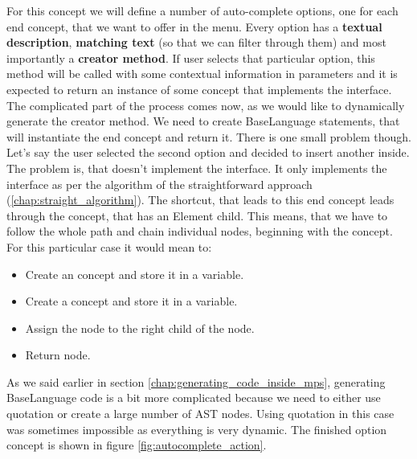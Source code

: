 For this concept we will define a number of auto-complete options, one for each end concept, that we want to offer in the menu.
Every option has a \textbf{textual description}, \textbf{matching text} (so that we can filter through them) and most importantly a \textbf{creator method}.
If user selects that particular option, this method will be called with some contextual information in parameters and it is expected to return an instance of some concept that implements the  interface.
\\

The complicated part of the process comes now, as we would like to dynamically generate the creator method.
We need to create BaseLanguage statements, that will instantiate the end concept and return it.
There is one small problem though.
Let's say the user selected the second option and decided to insert another  inside.
The problem is, that  doesn't implement the  interface.
It only implements the  interface as per the algorithm of the straightforward approach (\ref{chap:straight_algorithm}).
The shortcut, that leads to this end concept leads through the  concept, that has an Element child.
This means, that we have to follow the whole path and chain individual nodes, beginning with the  concept.
For this particular case it would mean to:

\begin{itemize}
	\item Create an  concept and store it in a variable.

	\item Create a  concept and store it in a variable.

	\item Assign the  node to the right child of the  node.

	\item Return  node.
\end{itemize}

As we said earlier in section \ref{chap:generating_code_inside_mps}, generating BaseLanguage code is a bit more complicated because we need to either use quotation or create a large number of AST nodes.
Using quotation in this case was sometimes impossible as everything is very dynamic.
The finished option concept is shown in figure \ref{fig:autocomplete_action}.

